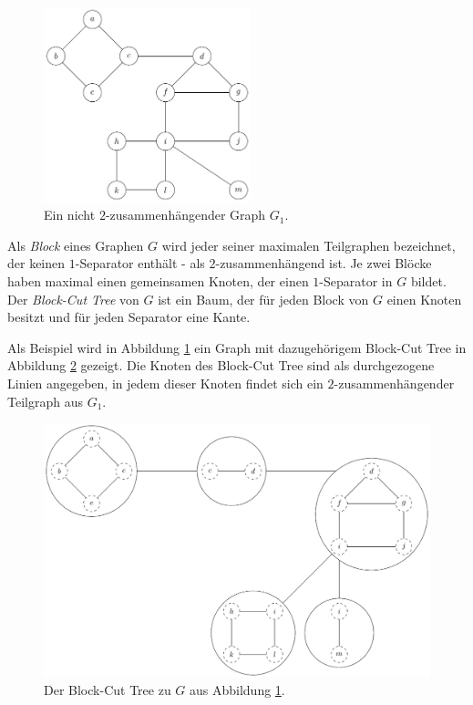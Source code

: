 \begin{figure}
  \includegraphics[width=6cm]{bilder/1-Block-Tree1.pdf}
  \caption{Ein nicht $2$-zusammenhängender Graph $G_1$.}
  \label{fig:1-Block-Tree1}
\end{figure}
\begin{definition}
  Als \emph{Block} eines Graphen $G$ wird jeder seiner maximalen Teilgraphen bezeichnet, der keinen $1$-Separator enthält - als $2$-zusammenhängend ist.
  Je zwei Blöcke haben maximal einen gemeinsamen Knoten, der einen $1$-Separator in $G$ bildet.
  Der \emph{Block-Cut Tree} von $G$ ist ein Baum, der für jeden Block von $G$ einen Knoten besitzt und für jeden Separator eine Kante\cite{BoM08}.
\end{definition}
Als Beispiel wird in Abbildung \ref{fig:1-Block-Tree1} ein Graph mit dazugehörigem Block-Cut Tree in Abbildung \ref{fig:1-Block-Tree2} gezeigt.
Die Knoten des Block-Cut Tree sind als durchgezogene Linien angegeben, in jedem dieser Knoten findet sich ein $2$-zusammenhängender Teilgraph aus $G_1$. %
\begin{figure}[H]
  \centering
  \includegraphics[width=\textwidth,height=\textheight,keepaspectratio]{bilder/1-Block-Tree2.pdf}
  \caption{Der Block-Cut Tree zu $G$ aus Abbildung \ref{fig:1-Block-Tree1}.}
  \label{fig:1-Block-Tree2}
\end{figure}

